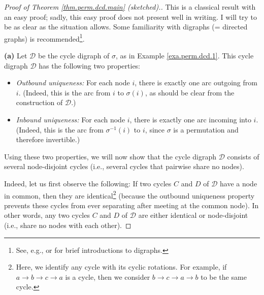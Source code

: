 \begin{proof}
[Proof of Theorem \ref{thm.perm.dcd.main} (sketched).]This is a classical
result with an easy proof; sadly, this easy proof does not present well in
writing. I will try to be as clear as the situation allows. Some familiarity
with digraphs (= directed graphs) is recommended\footnote{See, e.g.,
\cite[\S 5.11]{Guicha20} or \cite[\S 3.5]{Loehr-BC} for brief introductions to
digraphs.}. \medskip

\textbf{(a)} Let $\mathcal{D}$ be the cycle digraph of $\sigma$, as in Example
\ref{exa.perm.dcd.1}. This cycle digraph $\mathcal{D}$ has the following two properties:

\begin{itemize}
\item \textit{Outbound uniqueness:} For each node $i$, there is exactly one
arc outgoing from $i$. (Indeed, this is the arc from $i$ to $\sigma\left(
i\right)  $, as should be clear from the construction of $\mathcal{D}$.)

\item \textit{Inbound uniqueness:} For each node $i$, there is exactly one arc
incoming into $i$. (Indeed, this is the arc from $\sigma^{-1}\left(  i\right)
$ to $i$, since $\sigma$ is a permutation and therefore invertible.)
\end{itemize}

Using these two properties, we will now show that the cycle digraph
$\mathcal{D}$ consists of several node-disjoint cycles (i.e., several cycles
that pairwise share no nodes).

Indeed, let us first observe the following: If two cycles $C$ and $D$ of
$\mathcal{D}$ have a node in common, then they are identical\footnote{Here, we
identify any cycle with its cyclic rotations. For example, if $a\rightarrow
b\rightarrow c\rightarrow a$ is a cycle, then we consider $b\rightarrow
c\rightarrow a\rightarrow b$ to be the same cycle.} (because the outbound
uniqueness property prevents these cycles from ever separating after meeting
at the common node). In other words, any two cycles $C$ and $D$ of
$\mathcal{D}$ are either identical or node-disjoint (i.e., share no nodes with
each other).


\end{proof}
